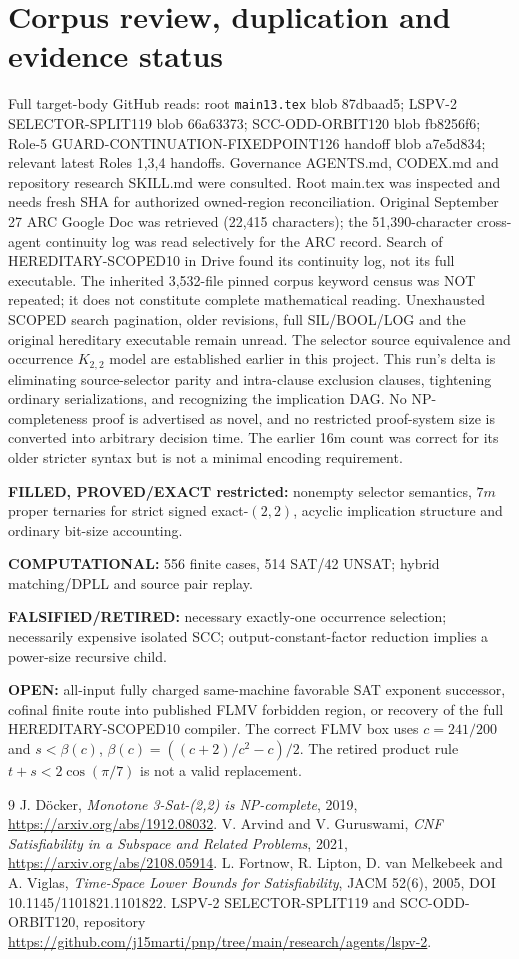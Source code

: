 \documentclass[11pt]{article}
\begin{document}
\section{Corpus review, duplication and evidence status}
Full target-body GitHub reads: root \texttt{main13.tex} blob 87dbaad5; LSPV-2 SELECTOR-SPLIT119 blob 66a63373; SCC-ODD-ORBIT120 blob fb8256f6; Role-5 GUARD-CONTINUATION-FIXEDPOINT126 handoff blob a7e5d834; relevant latest Roles 1,3,4 handoffs. Governance AGENTS.md, CODEX.md and repository research SKILL.md were consulted. Root main.tex was inspected and needs fresh SHA for authorized owned-region reconciliation. Original September 27 ARC Google Doc was retrieved (22,415 characters); the 51,390-character cross-agent continuity log was read selectively for the ARC record. Search of HEREDITARY-SCOPED10 in Drive found its continuity log, not its full executable. The inherited 3,532-file pinned corpus keyword census was NOT repeated; it does not constitute complete mathematical reading. Unexhausted SCOPED search pagination, older revisions, full SIL/BOOL/LOG and the original hereditary executable remain unread.
The selector source equivalence and occurrence $K_{2,2}$ model are established earlier in this project. This run's delta is eliminating source-selector parity and intra-clause exclusion clauses, tightening ordinary serializations, and recognizing the implication DAG. No NP-completeness proof is advertised as novel, and no restricted proof-system size is converted into arbitrary decision time. The earlier 16m count was correct for its older stricter syntax but is not a minimal encoding requirement.
\par\noindent\textbf{FILLED, PROVED/EXACT restricted:} nonempty selector semantics, $7m$ proper ternaries for strict signed exact-$(2,2)$, acyclic implication structure and ordinary bit-size accounting.
\par\noindent\textbf{COMPUTATIONAL:} 556 finite cases, 514 SAT/42 UNSAT; hybrid matching/DPLL and source pair replay.
\par\noindent\textbf{FALSIFIED/RETIRED:} necessary exactly-one occurrence selection; necessarily expensive isolated SCC; output-constant-factor reduction implies a power-size recursive child.
\par\noindent\textbf{OPEN:} all-input fully charged same-machine favorable SAT exponent successor, cofinal finite route into published FLMV forbidden region, or recovery of the full HEREDITARY-SCOPED10 compiler. The correct FLMV box uses $c=241/200$ and $s<\beta(c)$, $\beta(c)=((c+2)/c^2-c)/2$. The retired product rule $t+s<2\cos(\pi/7)$ is not a valid replacement.
\begin{thebibliography}{9}
 J. D\"ocker, \emph{Monotone 3-Sat-(2,2) is NP-complete}, 2019, \url{https://arxiv.org/abs/1912.08032}.
 V. Arvind and V. Guruswami, \emph{CNF Satisfiability in a Subspace and Related Problems}, 2021, \url{https://arxiv.org/abs/2108.05914}.
 L. Fortnow, R. Lipton, D. van Melkebeek and A. Viglas, \emph{Time-Space Lower Bounds for Satisfiability}, JACM 52(6), 2005, DOI 10.1145/1101821.1101822.
 LSPV-2 SELECTOR-SPLIT119 and SCC-ODD-ORBIT120, repository \url{https://github.com/j15marti/pnp/tree/main/research/agents/lspv-2}.
\end{thebibliography}
\end{document}
